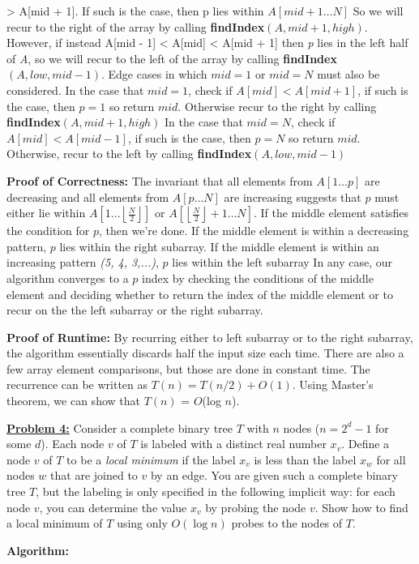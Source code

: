 \documentclass[11pt]{article}
\begin{document}
\begin{flushleft}
		\textgreater{ A[mid + 1]}. If such is the case, then p lies within $A[mid + 1 \dots N]$ So we will recur to the right of the array by calling \textbf{findIndex}$(A, mid + 1, high)$.
		However, if instead A[mid - 1] \textless{ A[mid]} \textless { A[mid + 1]} then \emph{p} lies in the left half of \emph{A}, so we will recur to the left of the array by calling
		\textbf{findIndex$(A, low, mid -1)$}.\newpage
		Edge cases in which $mid = 1$ or $mid = N$ must also be considered.\newline
		In the case that $mid = 1$, check if $A[mid] < A[mid + 1]$, if such is the case, then $p = 1$ so return $mid$. Otherwise recur to the right by calling \textbf{findIndex}$(A, mid + 1, high)$\newline
		In the case that $mid = N$, check if $A[mid] < A[mid - 1]$, if such is the case, then $p = N$ so return $mid$. Otherwise, recur to the left by calling \textbf{findIndex}$(A, low, mid - 1)$\newline
		  
		\textbf{Proof of Correctness:} The invariant that all elements from $A[1 \dots p]$ are decreasing and all elements from $A[p \dots N]$ are increasing suggests that $p$ must either lie within $A[1 \dots \left\lfloor\frac{N}{2}\right\rfloor]$ or 
		$A[\left\lfloor\frac{N}{2}\right\rfloor + 1 \dots N]$. \newline
		If the middle element satisfies the condition for $p$, then we're done.
		If the middle element is within a decreasing pattern, $p$ lies within the right subarray.  
		If the middle element is within an increasing pattern \emph{(5, 4, 3,...)}, $p$ lies within the left subarray
		In any case, our algorithm converges to a $p$ index by checking the conditions of the middle element and deciding whether to return the index of the middle element or to recur on the the left subarray or the right subarray. \newline
		\vspace{0.2cm}
		
		\textbf{Proof of Runtime:} By recurring either to left subarray or to the right subarray, the algorithm essentially discards half the input size each time. There are also a few array element comparisons, but those are done in constant time. The recurrence can be written as $T(n) = T(n / 2) + O(1)$. Using Master's theorem, we can show that $T(n)$ = $O$(log $n$).
		\vspace{0.2cm}
		
		\item \textbf {\underline{Problem 4:}} Consider a complete binary tree $T$ with $n$ nodes ($n = 2^d-1$ for some $d$). Each node $v$ of $T$ is labeled with a distinct real number $x_v$. Define a node $v$ of $T$ to be a \textit{local minimum} if the label $x_v$ is less than the label $x_w$ for all nodes $w$ that are joined to $v$ by an edge. You are given such a complete binary tree $T$, but the labeling is only specified in the following implicit way: for each node $v$, you can determine the value $x_v$ by probing the node $v$. Show how to find a local minimum of $T$ using only $O(\log n)$ probes to the nodes of $T$.\newline
		
		\textbf{Algorithm:}
		
	\end{flushleft}
\end{document}
